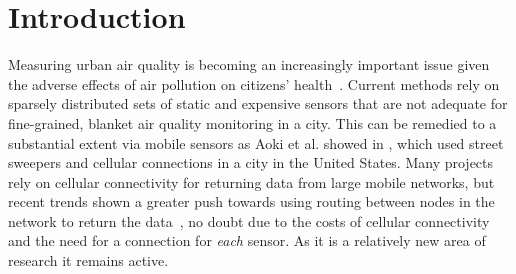 \chapter{Introduction}\label{introduction}



    Measuring urban air quality is becoming an increasingly important issue given the adverse effects of air pollution on citizens' health~\cite{beijing2point5high}. Current methods rely on sparsely distributed sets of static and expensive sensors that are not adequate for fine-grained, blanket air quality monitoring in a city. This can be remedied to a substantial extent via mobile sensors as Aoki et al. showed in \cite{vehicleforresearch}, which used street sweepers and cellular connections in a city in the United States. Many projects rely on cellular connectivity for returning data from large mobile networks, but recent trends shown a greater push towards using routing between nodes in the network to return the data~\cite{manetmessaging,cafnet,cartel,commonsense}, no doubt due to the costs of cellular connectivity and the need for a connection for \emph{each} sensor. As it is a relatively new area of research it remains active. 

